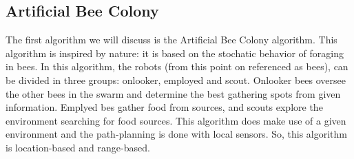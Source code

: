
\subsection{Artificial Bee Colony}
The first algorithm we will discuss is the Artificial Bee Colony algorithm. \cite{bhattacharjee2011multi}
This algorithm is inspired by nature: it is based on the stochatic behavior of foraging in bees.
In this algorithm, the robots (from this point on referenced as bees), can be divided in three groups: onlooker, employed and scout.
Onlooker bees oversee the other bees in the swarm and determine the best gathering spots from given information. 
Emplyed bes gather food from sources, and scouts explore the environment searching for food sources.
This algorithm does make use of a given environment and the path-planning is done with local sensors. 
So, this algorithm is location-based and range-based.\\

